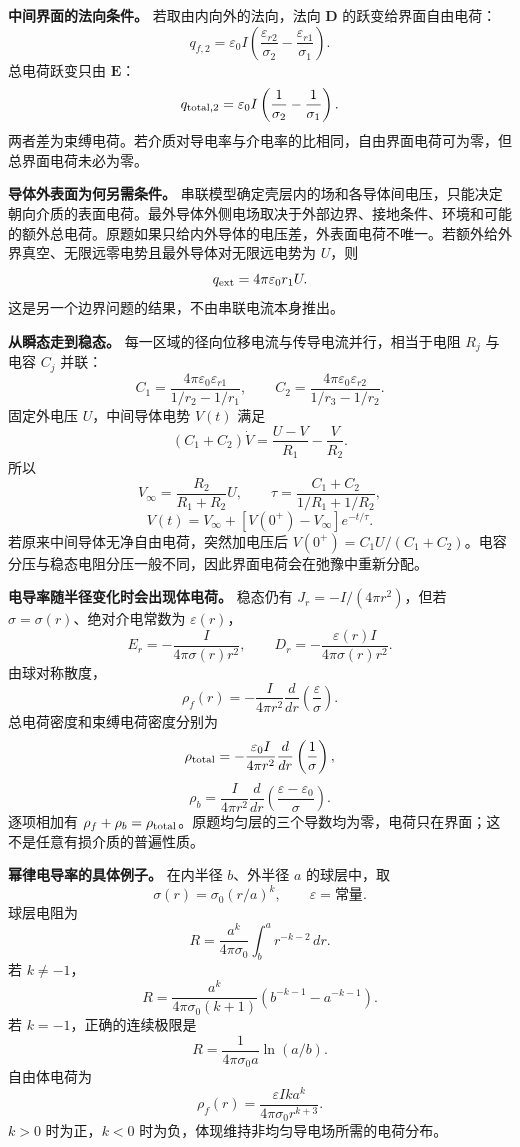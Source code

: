 \documentclass[12pt,a4paper,UTF8]{ctexart}
\begin{document}
\textbf{中间界面的法向条件。} 若取由内向外的法向，法向 \(\boldsymbol D\)
的跃变给界面自由电荷： \[
q_{f,2}=\varepsilon_0I
\left(\frac{\varepsilon_{r2}}{\sigma_2}
-\frac{\varepsilon_{r1}}{\sigma_1}\right).
\] 总电荷跃变只由 \(\boldsymbol E\)： \[
q_{{\rm total},2}=\varepsilon_0I
\left(\frac1{\sigma_2}-\frac1{\sigma_1}\right).
\]
两者差为束缚电荷。若介质对导电率与介电率的比相同，自由界面电荷可为零，但总界面电荷未必为零。

\textbf{导体外表面为何另需条件。}
串联模型确定壳层内的场和各导体间电压，只能决定朝向介质的表面电荷。最外导体外侧电场取决于外部边界、接地条件、环境和可能的额外总电荷。原题如果只给内外导体的电压差，外表面电荷不唯一。若额外给外界真空、无限远零电势且最外导体对无限远电势为
\(U\)，则 \[
q_{\rm ext}=4\pi\varepsilon_0r_1U.
\] 这是另一个边界问题的结果，不由串联电流本身推出。

\textbf{从瞬态走到稳态。}
每一区域的径向位移电流与传导电流并行，相当于电阻 \(R_j\) 与电容 \(C_j\)
并联： \[
C_1=\frac{4\pi\varepsilon_0\varepsilon_{r1}}
{1/r_2-1/r_1},\qquad
C_2=\frac{4\pi\varepsilon_0\varepsilon_{r2}}
{1/r_3-1/r_2}.
\] 固定外电压 \(U\)，中间导体电势 \(V(t)\) 满足 \[
(C_1+C_2)\dot V=\frac{U-V}{R_1}-\frac V{R_2}.
\] 所以 \[
V_\infty=\frac{R_2}{R_1+R_2}U,\qquad
\tau=\frac{C_1+C_2}{1/R_1+1/R_2},
\] \[
V(t)=V_\infty+[V(0^+)-V_\infty]e^{-t/\tau}.
\] 若原来中间导体无净自由电荷，突然加电压后
\(V(0^+)=C_1U/(C_1+C_2)\)。电容分压与稳态电阻分压一般不同，因此界面电荷会在弛豫中重新分配。

\textbf{电导率随半径变化时会出现体电荷。} 稳态仍有
\(J_r=-I/(4\pi r^2)\)，但若 \(\sigma=\sigma(r)\)、绝对介电常数为
\(\varepsilon(r)\)， \[
E_r=-\frac I{4\pi\sigma(r)r^2},\qquad
D_r=-\frac{\varepsilon(r)I}{4\pi\sigma(r)r^2}.
\] 由球对称散度， \[
\boxed{\rho_f(r)=
-\frac I{4\pi r^2}\frac d{dr}\left(\frac{\varepsilon}{\sigma}\right)}.
\] 总电荷密度和束缚电荷密度分别为 \[
\rho_{\rm total}=
-\frac{\varepsilon_0 I}{4\pi r^2}\frac d{dr}\left(\frac1\sigma\right),
\] \[
\rho_b=\frac I{4\pi r^2}
\frac d{dr}\left(\frac{\varepsilon-\varepsilon_0}{\sigma}\right).
\] 逐项相加有
\(\rho_f+\rho_b=\rho_{\rm total}\)。原题均匀层的三个导数均为零，电荷只在界面；这不是任意有损介质的普遍性质。

\textbf{幂律电导率的具体例子。} 在内半径 \(b\)、外半径 \(a\)
的球层中，取 \[
\sigma(r)=\sigma_0(r/a)^k,\qquad \varepsilon=\text{常量}.
\] 球层电阻为 \[
R=\frac{a^k}{4\pi\sigma_0}\int_b^a r^{-k-2}\,dr.
\] 若 \(k\ne-1\)， \[
\boxed{R=\frac{a^k}{4\pi\sigma_0(k+1)}
\left(b^{-k-1}-a^{-k-1}\right)}.
\] 若 \(k=-1\)，正确的连续极限是 \[
R=\frac1{4\pi\sigma_0a}\ln(a/b).
\] 自由体电荷为 \[
\boxed{\rho_f(r)=
\frac{\varepsilon Ika^k}{4\pi\sigma_0r^{k+3}}}.
\] \(k>0\) 时为正，\(k<0\) 时为负，体现维持非均匀导电场所需的电荷分布。
\end{document}
